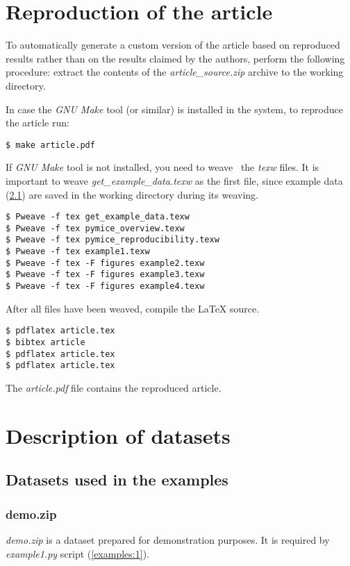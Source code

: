 \documentclass[smallextended]{svjour3}       %
\begin{document}
\section{Reproduction of the article}
\label{reproduction}
To automatically generate a custom version of the article based on reproduced
results rather than on the results claimed by the authors, perform the following
procedure: extract the contents of the
\emph{article\_source.zip} archive to the working directory.

In case the \emph{GNU Make} tool (or similar) is installed in the system, to
reproduce the article run:
\begin{verbatim}
$ make article.pdf
\end{verbatim}

If \emph{GNU Make} tool is not installed, you need to weave~\cite{literateProgramming}
the \emph{texw} files.
It is important to weave \emph{get\_example\_data.texw} as the first file,
since example data (\ref{data:examples}) are saved in the working directory
during its weaving.

\begin{verbatim}
$ Pweave -f tex get_example_data.texw
$ Pweave -f tex pymice_overview.texw
$ Pweave -f tex pymice_reproducibility.texw
$ Pweave -f tex example1.texw
$ Pweave -f tex -F figures example2.texw
$ Pweave -f tex -F figures example3.texw
$ Pweave -f tex -F figures example4.texw
\end{verbatim}

After all files have been weaved, compile the \LaTeX{} source.

\begin{verbatim}
$ pdflatex article.tex
$ bibtex article
$ pdflatex article.tex
$ pdflatex article.tex
\end{verbatim}

The \emph{article.pdf} file contains the reproduced article.


\section{Description of datasets}
\subsection{Datasets used in the examples}
\label{data:examples}


\subsubsection{demo.zip}
\label{data:examples:demo}
\emph{demo.zip} is a dataset prepared for demonstration purposes.
It is required by \emph{example1.py} script (\ref{examples:1}).
\end{document}
